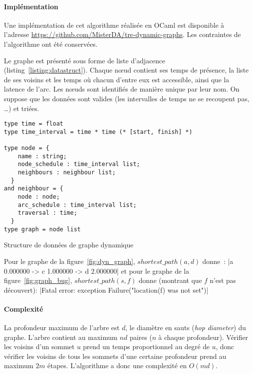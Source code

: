 \documentclass[12pt,a4paper]{article}
\begin{document}
\paragraph{Implémentation}
Une implémentation de cet algorithme réalisée en OCaml est disponible
à l'adresse \url{https://github.com/MisterDA/tre-dynamic-graphs}. Les
contraintes de l'algorithme ont été conservées.

Le graphe est présenté sous forme de liste d'adjacence
(listing~\ref{listing:datastruct}). Chaque nœud contient ses temps de
présence, la liste de ses voisins et les temps où chacun d'entre eux
est accessible, ainsi que la latence de l'arc. Les nœuds sont
identifiés de manière unique par leur nom. On suppose que les données
sont valides (les intervalles de temps ne se recoupent pas, …)  et
triées.\\

\begin{listing}[h]
  \begin{verbatim}
type time = float
type time_interval = time * time (* [start, finish] *)

type node = {
    name : string;
    node_schedule : time_interval list;
    neighbours : neighbour list;
  }
and neighbour = {
    node : node;
    arc_schedule : time_interval list;
    traversal : time;
  }
type graph = node list
  \end{verbatim}
  \caption{Structure de données de graphe
    dynamique}\label{listing:datastruct}
\end{listing}

Pour le graphe de la figure~\ref{fig:dyn_graph},
\(shortest\_path(a, d)\) donne~:
|a 0.000000 -> c 1.000000 -> d 2.000000|
et pour le graphe de la figure~\ref{fig:graph_bug},
\(shortest\_path(s, f)\) donne (montrant que \(f\) n'est pas
découvert):
|Fatal error: exception Failure("location(f) was not set")|

\paragraph{Complexité} La profondeur maximum de l'arbre est \(d\), le
diamètre en sauts (\textit{hop diameter}) du graphe. L'arbre contient
au maximum \(n d\) paires (\(n\) à chaque profondeur). Vérifier les
voisins d'un sommet \(u\) prend un temps proportionnel au degré de
\(u\), donc vérifier les voisins de tous les sommets d'une certaine
profondeur prend au maximum \(2m\) étapes. L'algorithme a donc une
complexité en \(O(m d)\).
\end{document}
